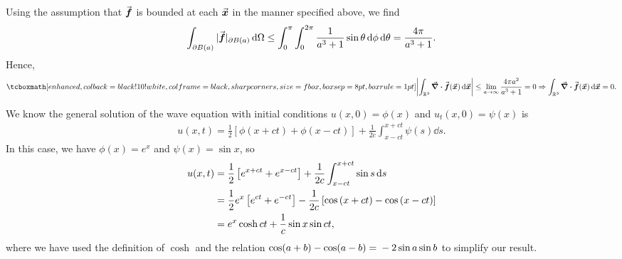 Using the assumption that $\va*{f}$ is bounded at each $\va*{x}$ in the manner specified above, we find
\begin{eqnarray}
    \label{eq:inequality-f}
    \int_{\partial B(a)} |\va*{f}|_{\partial B(a)} \dd{\Omega} \leq \int_{0}^{\pi}\int_{0}^{2\pi} \frac{1}{a^3 + 1} \sin{\theta} \dd{\phi}\dd{\theta} = \frac{4 \pi}{a^3 + 1}
.\end{eqnarray}
Hence,
\begin{eqnarray}
    \label{eq:result-3_10}
    \eqbox{
        \left| \int_{\reals^3} \div{\va*{f}(\va*{x})} \dd{\va*{x}} \right| \leq \lim_{a \rightarrow \infty} \frac{4 \pi a^2}{a^3 + 1} = 0 \Rightarrow \int_{\reals^3} \div{\va*{f}(\va*{x})} \dd{\va*{x}} = 0
    } 
.\end{eqnarray}


We know the general solution of the wave equation with initial conditions $u(x,0) = \phi(x)$ and $u_{t}(x,0) = \psi(x)$ is 
\begin{eqnarray}
    \label{eq:wave-initial-cond-sol}
    u(x,t) = \frac{1}{2}\left[ \phi(x+ct) + \phi(x-ct) \right] + \frac{1}{2c}\int_{x - ct}^{x + ct} \psi(s) \dd{s}
.\end{eqnarray}
In this case, we have $\phi(x) = e^{x}$ and $\psi(x) = \sin{x}$, so
\begin{align}
    \label{eq:wave-soln}
    u(x,t) &= \frac{1}{2}\left[ e^{x + ct} + e^{x - ct} \right] + \frac{1}{2c}\int_{x-ct}^{x+ct} \sin{s} \dd{s} \notag \\
           &= \frac{1}{2}e^{x}\left[ e^{ct} + e^{-ct} \right] - \frac{1}{2c}\left[ \cos{(x+ct)} - \cos{(x-ct)} \right] \notag \\
           &= e^{x} \cosh{ct} + \frac{1}{c}\sin{x}\sin{ct}
,\end{align}
where we have used the definition of $\cosh$ and the relation $\cos(a+b) - \cos(a-b) = \\ -2\sin{a}\sin{b}$ to simplify our result. 


